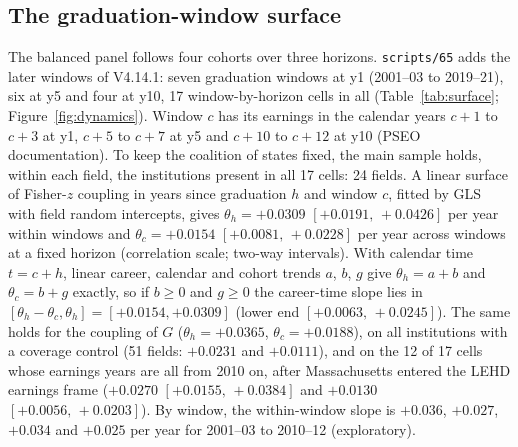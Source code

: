 \documentclass[11pt]{article}
\newcommand{\ci}[2]{$[#1,\allowbreak\,#2]$}
\newcommand{\scr}[1]{\texttt{scripts/#1}}
\begin{document}
\subsection{The graduation-window surface}\label{sec:surface}

The balanced panel follows four cohorts over three horizons. \scr{65} adds the later windows of V4.14.1: seven
graduation windows at y1 (2001--03 to 2019--21), six at y5 and four at y10, 17 window-by-horizon cells in all
(Table~\ref{tab:surface}; Figure~\ref{fig:dynamics}). Window $c$ has its earnings in the calendar years $c+1$ to
$c+3$ at y1, $c+5$ to $c+7$ at y5 and $c+10$ to $c+12$ at y10 (PSEO documentation). To keep the coalition of states
fixed, the main sample holds, within each field, the institutions present in all 17 cells: 24 fields. A linear
surface of Fisher-$z$ coupling in years since graduation $h$ and window $c$, fitted by GLS with field random
intercepts, gives $\theta_h=+0.0309$ \ci{+0.0191}{+0.0426} per year within windows and $\theta_c=+0.0154$
\ci{+0.0081}{+0.0228} per year across windows at a fixed horizon (correlation scale; two-way intervals). With calendar
time $t=c+h$, linear career, calendar and cohort trends $a$, $b$, $g$ give $\theta_h=a+b$ and $\theta_c=b+g$ exactly,
so if $b\ge0$ and $g\ge0$ the career-time slope lies in $[\theta_h-\theta_c,\theta_h]=[+0.0154,+0.0309]$ (lower end
\ci{+0.0063}{+0.0245}). The same holds for the coupling of $G$ ($\theta_h=+0.0365$, $\theta_c=+0.0188$), on all
institutions with a coverage control (51 fields: $+0.0231$ and $+0.0111$), and on the 12 of 17 cells whose earnings
years are all from 2010 on, after Massachusetts entered the LEHD earnings frame ($+0.0270$ \ci{+0.0155}{+0.0384} and
$+0.0130$ \ci{+0.0056}{+0.0203}). By window, the within-window slope is $+0.036$, $+0.027$, $+0.034$ and
$+0.025$ per year for 2001--03 to 2010--12 (exploratory).
\end{document}

